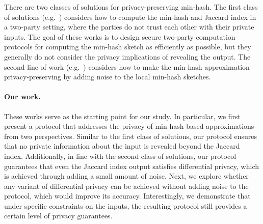 There are two classes of solutions for privacy-preserving min-hash.  The first class of solutions (e.g.~\cite{wpes:CFGT12,BluCriGas14,eprint:RCSWK19,Faber:thesis}) considers how to compute the min-hash and Jaccard index in a two-party setting, where the parties do not trust each other with their private inputs.  The goal of these works is to design secure two-party computation protocols for computing the min-hash sketch as efficiently as possible, but they generally do not consider the privacy implications of revealing the output.  The second line of work (e.g.~\cite{arxiv:YLLHQ17,conc:YWRLLQ19,sisap:AumBouSch20}) considers how to make the min-hash approximation privacy-preserving by adding noise to the local min-hash sketches.  



\paragraph{Our work.}
These works serve as the starting point for our study. In particular, we first
present a protocol that addresses the privacy of min-hash-based approximations
from two perspectives. Similar to the first class of solutions, our protocol
ensures that no private information about the input is revealed beyond the
Jaccard index. Additionally, in line with the second class of solutions, our
protocol guarantees that even the Jaccard index output satisfies differential
privacy, which is achieved through adding a small amount of noise.  
%
Next, we explore whether any variant of differential privacy can be achieved without adding noise to the protocol, which would improve its accuracy. Interestingly, we demonstrate that under specific constraints on the inputs, the resulting protocol still provides a certain level of privacy guarantees.



